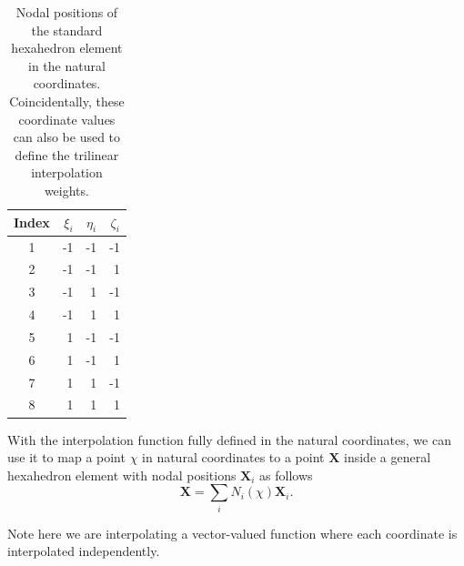 \begin{table}
	\begin{center}
		\begin{tabular}{ |c| r r r|}
			\hline
			Index & $\xi_i$ & $\eta_i$ & $\zeta_i$ \\ \hline
			1 & -1 & -1 & -1\\  
			2 & -1 & -1 & 1\\
			3 & -1 & 1 & -1\\  
			4 & -1 & 1 & 1\\
			5 & 1 & -1 & -1\\  
			6 & 1 & -1 & 1\\
			7 & 1 & 1 & -1\\  
			8 & 1 & 1 & 1\\
		\hline						
		\end{tabular}
	\end{center}
	\caption{Nodal positions of the standard hexahedron element in the natural coordinates.
		Coincidentally, these coordinate values can also be used to define the trilinear interpolation weights.}
	\label{tab:natCoord}
\end{table}

With the interpolation function fully defined in the natural coordinates, 
we can use it to map a point $\chi$ in natural coordinates to a point
$\mathbf{X}$ inside a general hexahedron element with nodal positions $\mathbf{X}_i$ as follows
\begin{equation}
	\mathbf{X}=\sum_i N_i(\chi)\mathbf{X}_i.
	\label{eq:rest}
\end{equation}

Note here we are interpolating a vector-valued function where each coordinate is interpolated independently.
